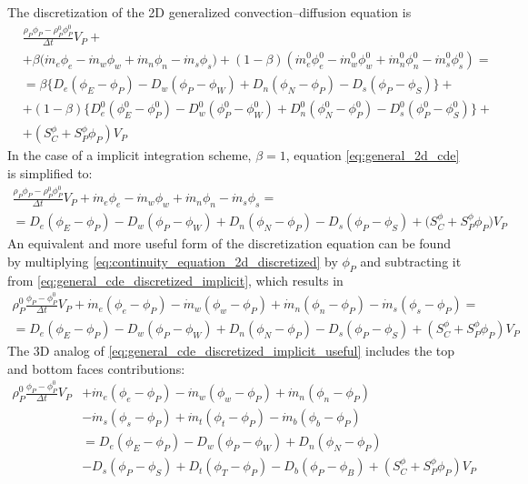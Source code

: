 The discretization of the 2D generalized convection--diffusion equation is
\begin{align}
	&\frac{\rho_P \phi_P - \rho_P^0 \phi_P^0}{\Delta t} V_P + \nonumber \\
	&+ 
	\beta 
	\Big( \dot{m}_e \phi_e - \dot{m}_w \phi_w + \dot{m}_n \phi_n - \dot{m}_s \phi_s \Big) + 
	(1 - \beta) 
	\left( \dot{m}_e^0 \phi_e^0 - \dot{m}_w^0 \phi_w^0 + \dot{m}_n^0 \phi_n^0 - \dot{m}_s^0 \phi_s^0 \right) =  \nonumber \\
	&= 
	\beta 
	\Big\{ 
	D_e (\phi_E - \phi_P) - D_w (\phi_P - \phi_W) + D_n (\phi_N - \phi_P) - D_s (\phi_P - \phi_S) 
	\Big\} + \nonumber \\
	&+ (1 - \beta)
	\Big\{ 
	D_e^0 (\phi_E^0 - \phi_P^0) - D_w^0 (\phi_P^0 - \phi_W^0) + 
	D_n^0 (\phi_N^0 - \phi_P^0) - D_s^0 (\phi_P^0 - \phi_S^0)
	\Big\} + \nonumber \\
	&+ \left( S_C^\phi + S_P^\phi \phi_P \right) V_P \label{eq:general_2d_cde}
\end{align}
In the case of a implicit integration scheme, \ie $\beta = 1$, equation
\eqref{eq:general_2d_cde} is simplified to:
\begin{multline} \label{eq:general_cde_discretized_implicit}
	\frac{\rho_P \phi_P - \rho_P^0 \phi_P^0}{\Delta t} V_P + 
	\dot{m}_e \phi_e - \dot{m}_w \phi_w + \dot{m}_n \phi_n - \dot{m}_s \phi_s = \\ = 
	D_e (\phi_E - \phi_P) - D_w (\phi_P - \phi_W) + D_n (\phi_N - \phi_P) - D_s (\phi_P - \phi_S) +
	\big( S_C^\phi + S_P^\phi \phi_P \big) V_P
\end{multline}
An equivalent and more useful form of the discretization equation can be found
by multiplying \eqref{eq:continuity_equation_2d_discretized} by $\phi_P$ and
subtracting it from \eqref{eq:general_cde_discretized_implicit}, which results
in
\begin{multline} \label{eq:general_cde_discretized_implicit_useful}
	\rho_P^0 \frac{\phi_P - \phi_P^0}{\Delta t} V_P
	+ \dot{m}_e (\phi_e - \phi_P) - \dot{m}_w (\phi_w - \phi_P) 
	+ \dot{m}_n (\phi_n - \phi_P) - \dot{m}_s (\phi_s - \phi_P) 
	= \\
	= D_e (\phi_E - \phi_P) - D_w (\phi_P - \phi_W)
	+ D_n (\phi_N - \phi_P) - D_s (\phi_P - \phi_S)
	+ (S_C^\phi + S_P^\phi \phi_P) V_P
\end{multline}
The 3D analog of \eqref{eq:general_cde_discretized_implicit_useful} includes the
top and bottom faces contributions:
\begin{align}
	\rho_P^0 \frac{\phi_P - \phi_P^0}{\Delta t} V_P
	&+ \dot{m}_e (\phi_e - \phi_P) - \dot{m}_w (\phi_w - \phi_P)  + \dot{m}_n (\phi_n - \phi_P) 
	\nonumber \\
	&- \dot{m}_s (\phi_s - \phi_P) + \dot{m}_t (\phi_t - \phi_P) - \dot{m}_b (\phi_b - \phi_P) 
	\nonumber \\
	&= D_e (\phi_E - \phi_P) - D_w (\phi_P - \phi_W) + D_n (\phi_N - \phi_P) 
	\nonumber \\
	&- D_s (\phi_P - \phi_S) + D_t (\phi_T - \phi_P) - D_b (\phi_P - \phi_B) + (S_C^\phi + S_P^\phi \phi_P) V_P
\end{align}

